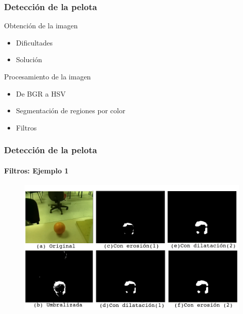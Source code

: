\documentclass{beamer}
\begin{document}
\begin{frame}
\frametitle{Detecci\'on de la pelota}

\begin{block}{Obtenci\'on de la imagen}
	\begin{itemize}
		\item Dificultades
		\item Soluci\'on	
	\end{itemize}
\end{block}

\begin{block}{Procesamiento de la imagen}
	\begin{itemize}
	\item De BGR a HSV
	\item Segmentaci\'on de regiones por color
	\item Filtros 
    \end{itemize}		
\end{block}

\end{frame}

\begin{frame}
\frametitle{Detecci\'on de la pelota}
\framesubtitle{Filtros: Ejemplo 1}

\begin{figure}[hbtp]
\centering
\includegraphics[scale=0.3]{filtros.png} 
\end{figure}

\end{frame}
\end{document}
